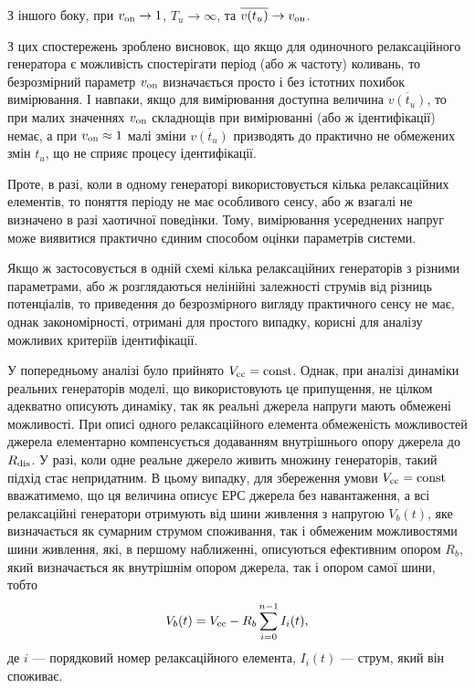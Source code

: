 З іншого боку, при
$v _\mathrm{on} \to 1 $,
$T_u \to \infty $,
та
$\overline{v(t_u)} \to v_\mathrm{on}$.

З цих спостережень зроблено висновок, що якщо для одиночного
релаксаційного генератора є можливість спостерігати період
(або ж частоту) коливань, то безрозмірний параметр
$v _\mathrm{on} $ визначається просто і без істотних похибок
вимірювання. І навпаки, якщо для вимірювання доступна величина
$\overline{v (t_u)} $, то при малих значеннях
$v _\mathrm{on} $ складнощів при вимірюванні (або ж ідентифікації) немає,
а при
$v _\mathrm{on} \approx 1 $ малі зміни
$\overline{v (t_u)} $ призводять до практично не обмежених змін
$t_u $, що не сприяє процесу ідентифікації.

Проте, в разі, коли в одному генераторі використовується
кілька релаксаційних елементів, то поняття періоду не має
особливого сенсу, або ж взагалі не визначено в разі хаотичної
поведінки. Тому, вимірювання усереднених напруг може виявитися
практично єдиним способом оцінки параметрів системи.


Якщо ж застосовується в одній схемі кілька релаксаційних
генераторів з різними параметрами, або ж розглядаються
нелінійні залежності струмів від різниць потенціалів, то
приведення до безрозмірного вигляду практичного сенсу не має,
однак закономірності, отримані для простого випадку, корисні
для аналізу можливих критеріїв ідентифікації.


У попередньому аналізі було прийнято
$V_\mathrm{cc} = \mathrm{const} $. Однак, при аналізі динаміки реальних
генераторів моделі, що використовують це припущення, не цілком
адекватно описують динаміку, так як реальні джерела напруги
мають обмежені можливості. При описі одного релаксаційного
елемента обмеженість можливостей джерела елементарно
компенсується додаванням внутрішнього опору джерела до
$R _\mathrm{dis} $. У разі, коли одне реальне джерело живить множину
генераторів, такий підхід стає непридатним. В цьому випадку,
для збереження умови
$V _\mathrm{cc} = \mathrm{const} $ вважатимемо, що ця величина описує ЕРС джерела
без навантаження, а всі релаксаційні генератори отримують від
шини живлення з напругою
$V_b (t) $, яке визначається як сумарним струмом споживання,
так і обмеженим можливостями шини живлення, які, в першому
наближенні, описуються ефективним опором
$R_b $, який визначається як внутрішнім опором джерела, так і
опором самої шини, тобто
%
\begin{equation}
  V_b(t) = V_\mathrm{cc} - R_b \sum\limits_{i=0}^{n-1} I_i(t),
  \label{atu:eq:V_b_relax}
\end{equation}
%
де $i$ ---
порядковий номер релаксаційного елемента,
$I_i (t) $ --- струм, який він споживає.


